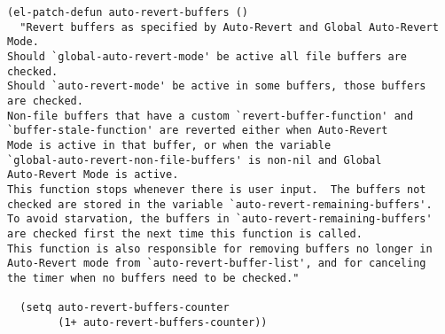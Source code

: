 \documentclass[11pt]{article}
\begin{document}
\begin{verbatim}
(el-patch-defun auto-revert-buffers ()
  "Revert buffers as specified by Auto-Revert and Global Auto-Revert Mode.
Should `global-auto-revert-mode' be active all file buffers are checked.
Should `auto-revert-mode' be active in some buffers, those buffers
are checked.
Non-file buffers that have a custom `revert-buffer-function' and
`buffer-stale-function' are reverted either when Auto-Revert
Mode is active in that buffer, or when the variable
`global-auto-revert-non-file-buffers' is non-nil and Global
Auto-Revert Mode is active.
This function stops whenever there is user input.  The buffers not
checked are stored in the variable `auto-revert-remaining-buffers'.
To avoid starvation, the buffers in `auto-revert-remaining-buffers'
are checked first the next time this function is called.
This function is also responsible for removing buffers no longer in
Auto-Revert mode from `auto-revert-buffer-list', and for canceling
the timer when no buffers need to be checked."

  (setq auto-revert-buffers-counter
        (1+ auto-revert-buffers-counter))


\end{verbatim}
\end{document}
